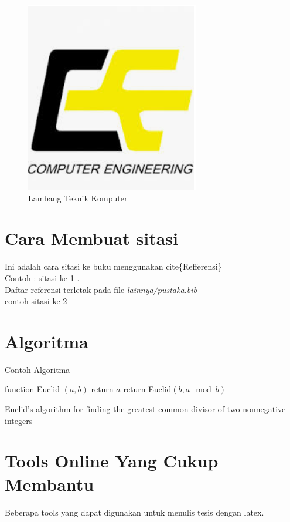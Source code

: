 \begin{figure}[H]
	\centering
	\includegraphics[width=0.5\linewidth]{bab2/LambangTeknikKOmputer}
	\caption{Lambang Teknik Komputer  }
	\label{fig:lambangteknikkomputer}
\end{figure}
\section{Cara Membuat  sitasi}

Ini adalah cara  sitasi ke buku menggunakan cite\{Refferensi\}\\

Contoh : sitasi ke 1
 \cite{Brathwaite2009}.\\
Daftar referensi terletak pada file 
\textit{lainnya/pustaka.bib}\\

contoh  sitasi ke 2
\cite{Friedman1997}
\newline
\section{Algoritma}
Contoh Algoritma

\begin{algorithm}[H]
	
	\underline{function Euclid} $(a,b)$\;
	{
		return $a$\;
	}
	{
		return Euclid$(b,a\mod b)$\;
	}
	\caption{Euclid's algorithm for finding the greatest common divisor of two nonnegative integers}
\end{algorithm}
\newpage
\section{Tools Online Yang Cukup Membantu}
Beberapa tools yang dapat digunakan untuk menulis tesis dengan latex.
